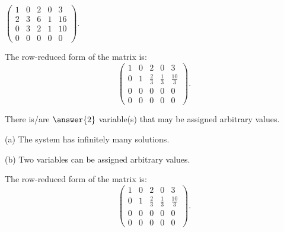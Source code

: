 \documentclass{ximera}
\begin{document}
\begin{exercise} \label{c2.3.11d}
$\left(\begin{array}{cccc|c} 1 & 0 & 2 & 0 & 3 \\ 2 & 3 & 6 & 1 & 16\\
         0 & 3 & 2 & 1 & 10 \\ 0 & 0 & 0 & 0 & 0  \end{array}\right)$.
     \begin{hint}
       The row-reduced form of the matrix is:
\[
\left(\begin{array}{rrrr|r} 1 & 0 & 2 & 0 & 3 \\ 0 & 1 & \frac{2}{3}
& \frac{1}{3} & \frac{10}{3} \\ 0 & 0 & 0 & 0 & 0 \\ 0 & 0 & 0 & 0 & 0
\end{array}\right).
\]
     \end{hint}
          \begin{multipleChoice}
     \end{multipleChoice}
     \begin{exercise}
       There is/are $\answer{2}$ variable(s) that may be assigned arbitrary values.

\begin{solution}

\ans (a) The system has infinitely many solutions.

(b) Two variables can be assigned arbitrary values.

\soln The row-reduced form of the matrix is:
\[
\left(\begin{array}{rrrr|r} 1 & 0 & 2 & 0 & 3 \\ 0 & 1 & \frac{2}{3}
& \frac{1}{3} & \frac{10}{3} \\ 0 & 0 & 0 & 0 & 0 \\ 0 & 0 & 0 & 0 & 0
\end{array}\right).
\]


\end{solution}
     \end{exercise}

\begin{solution}


\end{solution}
\end{exercise}
\end{document}
